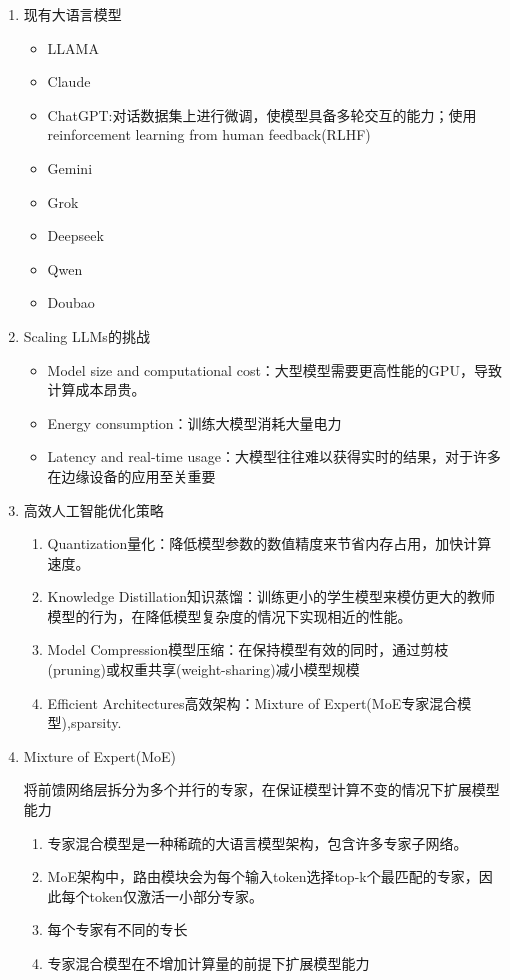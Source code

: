 \documentclass[UTF8]{ctexart}
\begin{document}
\begin{enumerate}
    \item 现有大语言模型
    \begin{itemize}
        \item LLAMA
        \item Claude
        \item ChatGPT:对话数据集上进行微调，使模型具备多轮交互的能力；使用reinforcement learning from human feedback(RLHF)
        \item Gemini
        \item Grok
        \item Deepseek
        \item Qwen
        \item Doubao
    \end{itemize}
    \item Scaling LLMs的挑战
    \begin{itemize}
        \item Model size and computational cost：大型模型需要更高性能的GPU，导致计算成本昂贵。
        \item Energy consumption：训练大模型消耗大量电力
        \item Latency and real-time usage：大模型往往难以获得实时的结果，对于许多在边缘设备的应用至关重要
    \end{itemize}
    \item 高效人工智能优化策略
    \begin{enumerate}
        \item Quantization量化：降低模型参数的数值精度来节省内存占用，加快计算速度。
        \item Knowledge Distillation知识蒸馏：训练更小的学生模型来模仿更大的教师模型的行为，在降低模型复杂度的情况下实现相近的性能。
        \item Model Compression模型压缩：在保持模型有效的同时，通过剪枝(pruning)或权重共享(weight-sharing)减小模型规模
        \item Efficient Architectures高效架构：Mixture of Expert(MoE专家混合模型),sparsity.
    \end{enumerate}
    \item Mixture of Expert(MoE)
    
    将前馈网络层拆分为多个并行的专家，在保证模型计算不变的情况下扩展模型能力

    \begin{enumerate}
        \item 专家混合模型是一种稀疏的大语言模型架构，包含许多专家子网络。
        \item MoE架构中，路由模块会为每个输入token选择top-k个最匹配的专家，因此每个token仅激活一小部分专家。
        \item 每个专家有不同的专长
        \item 专家混合模型在不增加计算量的前提下扩展模型能力
    \end{enumerate}
\end{enumerate}
\end{document}
